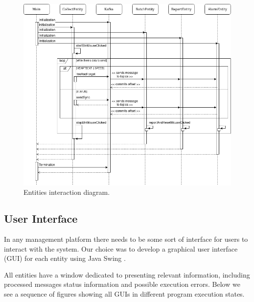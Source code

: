 \documentclass[12pt]{article}
\begin{document}
\begin{figure}[H]
  \centering
  \begin{minipage}{\textwidth}
    \centering
    \includegraphics[width=\linewidth]{img/InteractionDiagram.png} 
  \end{minipage}%
  \caption{Entities interaction diagram.}
  \label{InteractionDiagram}
\end{figure} 

\subsection{User Interface} %

In any management platform there needs to be some sort of interface for users to interact with the system.
Our choice was to develop a graphical user interface (GUI) for each entity using Java Swing \cite{swing}.

All entities have a window dedicated to presenting relevant information, including processed messages status information and possible execution errors.
Below we see a sequence of figures showing all GUIs in different program execution states.
 
\end{document}
